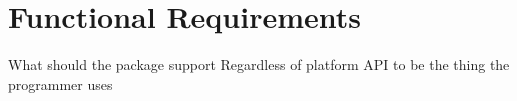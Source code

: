 \section{Functional Requirements}
What should the package support
Regardless of platform
API to be the thing the programmer uses

